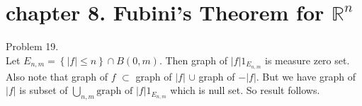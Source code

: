 \section*{chapter 8. Fubini's Theorem for $\mathbb{R}^n$ }

Problem 19. \\

Let $E_{n, m} = \left\{ |f| \leq n \right\} \cap B\left( 0, m \right) $. Then graph of $|f| 1_{E_{n, m}}$ is measure zero set. Also note that graph of $f$ $\subset$ graph of $|f|$ $\cup$ graph of  $-|f|$. But we have graph of $|f|$ is subset of $\bigcup_{n, m} \text{graph of } |f|1_{E_{n, m}}$ which is null set. So result follows.

